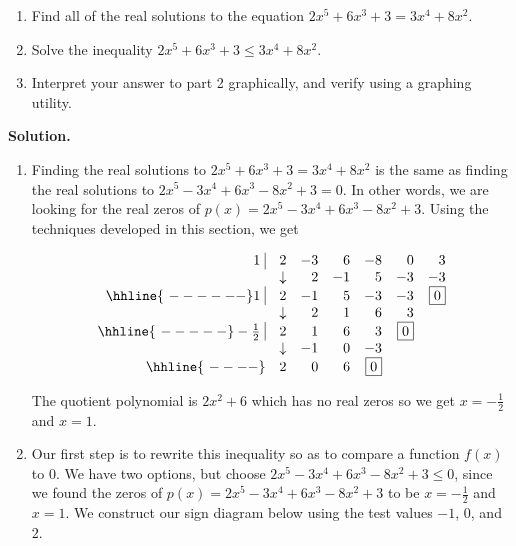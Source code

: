 \begin{ex}  \label{polyeqineqexample} $~$

\begin{enumerate}

\item  Find all of the real solutions to the equation $2x^5+6x^3+3 = 3x^4+8x^2$. 

\item  Solve the inequality $2x^5+6x^3+3 \leq 3x^4+8x^2$.

\item  Interpret your answer to part 2 graphically, and verify using a graphing utility.


\end{enumerate}

{\bf Solution.} 

\begin{enumerate}

\item  Finding the real solutions to $2x^5+6x^3+3 = 3x^4+8x^2$ is the same as finding the real solutions to $2x^5-3x^4+6x^3-8x^2+3=0$.  In other words, we are looking for the real zeros of $p(x)=  2x^5-3x^4+6x^3-8x^2+3$.  Using the techniques developed in this section, we get

\[\begin{array}{rrrrrrr}
1 \, \, \vline& 2 & -3 & 6  & -8 & 0 &3 \\

  & \downarrow     &  2  &  -1  & 5 & -3 & -3\\ \hhline{~------} 

 1 \, \, \vline& 2 & -1 & 5  & -3 & -3 & \fbox{$0$} \\

  & \downarrow     &  2 &  1  & 6 & 3 &\\ \hhline{~-----} 
  
  -\frac{1}{2} \, \, \vline&  2 &  1  & 6 & 3 &  \fbox{$0$} & \\
    
               & \downarrow &  -1  &  0  & -3 &&\\ \hhline{~----} 
 
   & 2  &   0  & 6& \fbox{0} &&   \\
  
\end{array}\]


The quotient polynomial is $2x^2 + 6$ which has no real zeros so we get $x=-\frac{1}{2}$ and $x=1$.   

\item Our first step is to rewrite this inequality so as to compare a function $f(x)$ to $0$.  We have two options, but choose $2x^5-3x^4+6x^3-8x^2+3 \leq 0$, since  we found the zeros of $p(x) = 2x^5-3x^4+6x^3-8x^2+3$ to be $x=-\frac{1}{2}$ and $x=1$. We construct our sign diagram below using the test values $-1$, $0$, and $2$.


\end{enumerate}
\end{ex}
